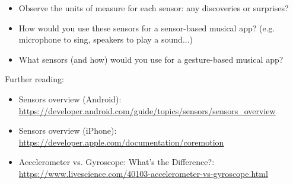 \documentclass[screen, aspectratio=43]{beamer}
\begin{document}
\begin{frame}
{\begin{itemize}
	\item Observe the units of measure for each sensor: any discoveries or surprises?
	\item How would you use these sensors for a sensor-based musical app? (e.g. microphone to sing, speakers to play a sound...)
	\item What sensors (and how) would you use for a gesture-based musical app?
    \end{itemize}
  }  
  {\tiny Further reading:
  \begin{itemize}
  	\item Sensors overview (Android): \\ \url{https://developer.android.com/guide/topics/sensors/sensors_overview}
	\item Sensors overview (iPhone): \\ \url{https://developer.apple.com/documentation/coremotion}
	\item Accelerometer vs. Gyroscope: What's the Difference?: \\ \url{https://www.livescience.com/40103-accelerometer-vs-gyroscope.html}
  \end{itemize}
  }
\end{frame}
%
\end{document}
